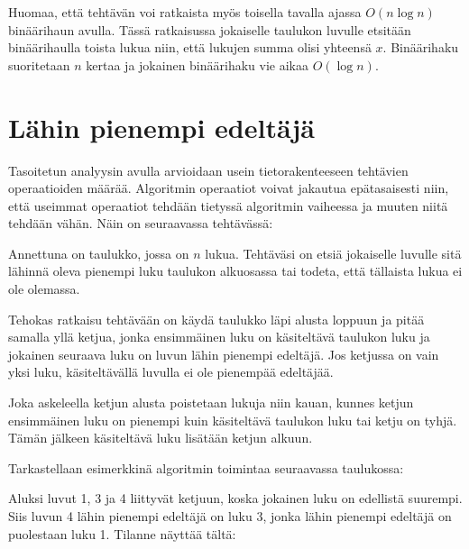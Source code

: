 Huomaa, että tehtävän voi ratkaista myös 
toisella tavalla ajassa
$O(n \log n)$ binäärihaun avulla.
Tässä ratkaisussa jokaiselle taulukon luvulle
etsitään binäärihaulla toista lukua niin,
että lukujen summa olisi yhteensä $x$.
Binäärihaku suoritetaan $n$ kertaa ja
jokainen binäärihaku vie aikaa $O(\log n)$.

\section{Lähin pienempi edeltäjä}


Tasoitetun analyysin avulla arvioidaan usein
tietorakenteeseen tehtävien operaatioiden määrää.
Algoritmin operaatiot voivat jakautua epätasaisesti
niin, että useimmat operaatiot tehdään tietyssä
algoritmin vaiheessa ja muuten niitä tehdään vähän.
Näin on seuraavassa tehtävässä:

\begin{task}
Annettuna on taulukko, jossa on $n$ lukua.
Tehtäväsi on etsiä jokaiselle luvulle
sitä lähinnä oleva pienempi luku
taulukon alkuosassa
tai todeta, että tällaista lukua ei ole olemassa.
\end{task}

Tehokas ratkaisu tehtävään on käydä
taulukko läpi alusta loppuun ja pitää samalla yllä ketjua,
jonka ensimmäinen luku on käsiteltävä taulukon luku
ja jokainen seuraava luku on luvun lähin
pienempi edeltäjä.
Jos ketjussa on vain yksi luku,
käsiteltävällä luvulla ei ole pienempää edeltäjää.

Joka askeleella ketjun alusta poistetaan lukuja
niin kauan, kunnes ketjun ensimmäinen luku on 
pienempi kuin käsiteltävä taulukon luku tai ketju on tyhjä.
Tämän jälkeen käsiteltävä luku lisätään ketjun alkuun.

Tarkastellaan esimerkkinä algoritmin toimintaa
seuraavassa taulukossa:

\begin{center}
\end{center}
Aluksi luvut 1, 3 ja 4 liittyvät ketjuun, koska jokainen luku on
edellistä suurempi. Siis luvun 4 lähin pienempi edeltäjä on luku 3,
jonka lähin pienempi edeltäjä on puolestaan luku 1. Tilanne näyttää tältä:

